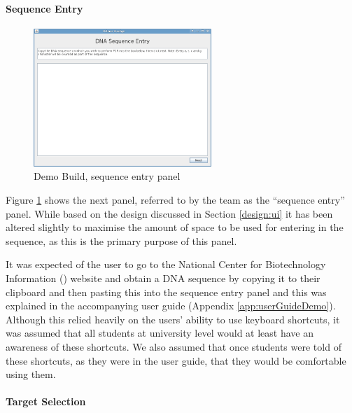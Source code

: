 \paragraph{Sequence Entry}

\begin{figure}[h]
  \begin{center}
    \includegraphics[width=0.6\textwidth]{./images/demoBuild/sequenceEntry.png}
    \caption{
      \label{fig:demoBuild:sequenceEntry}
      Demo Build, sequence entry panel 
    }
  \end{center}
\end{figure}

Figure \ref{fig:demoBuild:sequenceEntry} shows the next panel,
referred to by the team as the ``sequence entry'' panel.
While based on the design discussed in Section \ref{design:ui} it
has been altered slightly to maximise the amount of space to be used
for entering in the sequence, as this is the primary purpose of this
panel.

It was expected of the user to go to the National Center for
Biotechnology Information (\cite{ncbi}) website and obtain a DNA sequence by
copying it to their clipboard and then pasting this into the sequence
entry panel and this was explained in the accompanying user guide
(Appendix \ref{app:userGuideDemo}).
Although this relied heavily on the users' ability to use keyboard
shortcuts, it was assumed that all students at university level would
at least have an awareness of these shortcuts.
We also assumed that once students were told of these shortcuts, as
they were in the user guide, that they would be comfortable using
them.


\paragraph{Target Selection}

